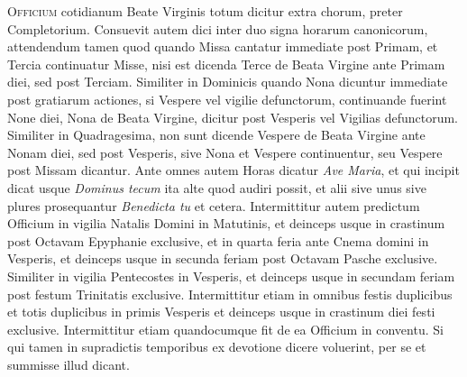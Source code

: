 \begin{multicols*}{2}

\lettrine[lines=2]{\zallmancaps \color{Red} O}{fficium} cotidianum Beate Virginis totum dicitur extra chorum, preter Completorium. Consuevit autem dici inter duo signa horarum canonicorum, attendendum tamen quod quando Missa cantatur immediate post Primam, et Tercia continuatur Misse, nisi est dicenda Terce de Beata Virgine ante Primam diei, sed post Terciam. Similiter in Dominicis quando Nona dicuntur immediate post gratiarum actiones, si Vespere vel vigilie defunctorum, continuande fuerint None diei, Nona de Beata Virgine, dicitur post Vesperis vel Vigilias defunctorum. Similiter in Quadragesima, non sunt dicende Vespere de Beata Virgine ante Nonam diei, sed post Vesperis, sive Nona et Vespere continuentur, seu Vespere post Missam dicantur.
Ante omnes autem Horas dicatur \textit{Ave Maria}, et qui incipit dicat usque \textit{Dominus tecum} ita alte quod audiri possit, et alii sive unus sive plures prosequantur \textit{Benedicta tu} et cetera.
Intermittitur autem predictum Officium in vigilia Natalis Domini in Matutinis, et deinceps usque in crastinum post Octavam Epyphanie exclusive, et in quarta feria ante Cnema domini in Vesperis, et deinceps usque in secunda feriam post Octavam Pasche exclusive. Similiter in vigilia Pentecostes in Vesperis, et deinceps usque in secundam feriam post festum Trinitatis exclusive.
Intermittitur etiam in omnibus festis duplicibus et totis duplicibus in primis Vesperis et deinceps usque in crastinum diei festi exclusive. Intermittitur etiam quandocumque fit de ea Officium in conventu. Si qui tamen in supradictis temporibus ex devotione dicere voluerint, per se et summisse illud dicant.


\end{multicols*}
